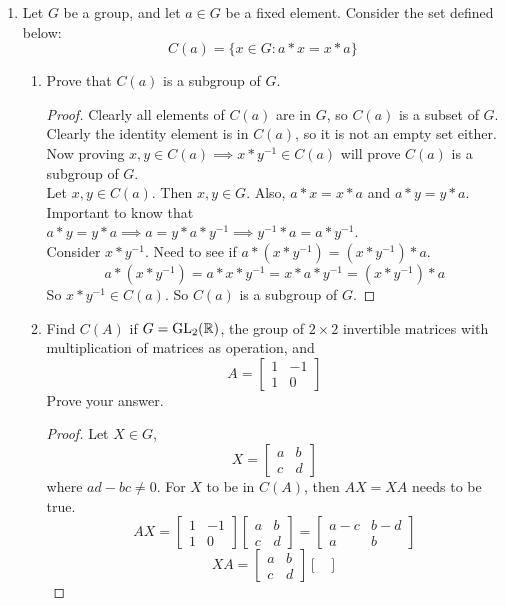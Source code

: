 \documentclass[12pt]{article}
\begin{document}
\begin{enumerate}
		\item Let $G$ be a group, and let $a \in G$ be a fixed element. Consider the set defined below:
		\[C(a) = \{x \in G : a * x = x * a\}\]
		\begin{enumerate}
			\item Prove that $C(a)$ is a subgroup of $G$.
			\begin{proof}
				Clearly all elements of $C(a)$ are in $G$, so $C(a)$ is a subset of $G$. Clearly the identity element is in $C(a)$, so it is not an empty set either. Now proving $x,y \in C(a) \implies x*y^{-1} \in C(a)$ will prove $C(a)$ is a subgroup of $G$.\\
				Let $x,y \in C(a)$. Then $x,y \in G$. Also, $a*x = x*a$ and $a*y = y*a$. Important to know that $a*y = y*a \implies a = y*a*y^{-1} \implies y^{-1}*a = a*y^{-1}$.\\
				Consider $x * y^{-1}$. Need to see if $a*(x * y^{-1}) = (x * y^{-1}) * a$.
				\[a*(x * y^{-1}) = a * x * y^{-1} = x * a * y^{-1} = (x*y^{-1})*a\]
				So $x * y^{-1} \in C(a)$. So $C(a)$ is a subgroup of $G$.
			\end{proof}
			\item Find $C(A)$ if $G = \text{GL}_2(\mathbb{R})$, the group of $2\times2$ invertible matrices with multiplication of matrices as operation, and
			\[A = \begin{bmatrix}
				1 & -1 \\
				1 & 0
			\end{bmatrix}\] Prove your answer.
			\begin{proof}
				Let $X \in G$,
				\[X = \begin{bmatrix}
					a & b \\
					c & d
				\end{bmatrix}\] where $ad-bc \neq 0$. For $X$ to be in $C(A)$, then $AX = XA$ needs to be true.
				\[AX = \begin{bmatrix}
					1 & -1 \\
					1 & 0
				\end{bmatrix}\begin{bmatrix}
					a & b \\
					c & d
				\end{bmatrix} = \begin{bmatrix}
					a-c & b-d \\
					a & b
				\end{bmatrix}\]
				\[XA = \begin{bmatrix}
					a & b \\
					c & d
				\end{bmatrix}\begin{bmatrix}

\end{bmatrix}\]
\end{proof}
\end{enumerate}
\end{enumerate}
\end{document}
